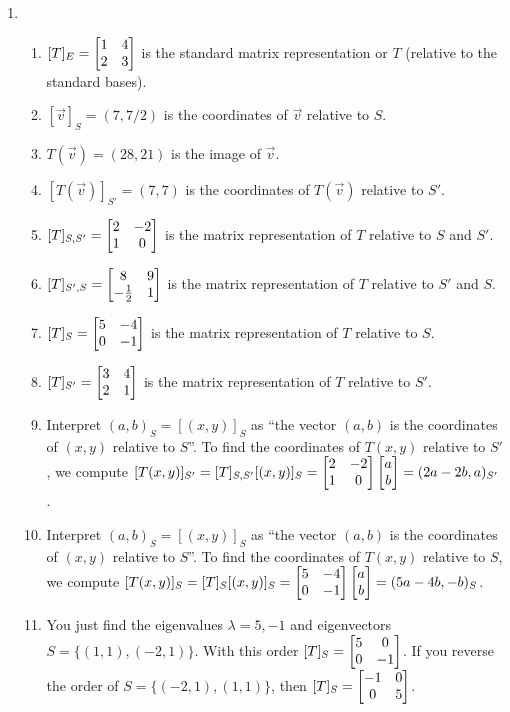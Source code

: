 {\begin{multicols}{2}
\begin{enumerate}
\item 
\begin{enumerate}
	\item $[T]_E = \begin{bmatrix}  1 & 4 \\2 & 3 \end{bmatrix}$ is the standard matrix representation or $T$ (relative to the standard bases).
	\item $[\vec v]_S = (7,7/2)$ is the coordinates of $\vec v$ relative to $S$. 
	\item $T(\vec v) = (28,21)$ is the image of $\vec v$.
	\item $[T(\vec v)]_{S'} = ( 7,7 ) $ is the coordinates  of $T(\vec v)$ relative to $S'$.
	\item $[T]_{S,S'}=\begin{bmatrix}  2 & -2 \\
 1 & 0
 \end{bmatrix}$ is the matrix representation of $T$ relative to $S$ and $S'$.
	\item $[T]_{S',S}=\begin{bmatrix}  8 & 9 \\
 -\frac{1}{2} & 1
 \end{bmatrix}$ is  the matrix representation of $T$  relative to $S'$ and $S$.
	\item $[T]_S=\begin{bmatrix}  5 & -4 \\
 0 & -1
 \end{bmatrix}$ is the matrix representation of $T$  relative to $S$.
	\item $[T]_{S'}=\begin{bmatrix}  3 & 4 \\
 2 & 1
 \end{bmatrix}$ is the matrix representation of $T$  relative to $S'$.
	\item Interpret $(a,b)_S = [(x,y)]_S$ as ``the vector $(a,b)$ is the coordinates of $(x,y)$ relative to $S$''.  To find the coordinates of $T(x,y)$ relative to $S'$, we compute $[T(x,y)]_{S'} = [T]_{S,S'}[(x,y)]_S = \begin{bmatrix}  2 & -2 \\
 1 & 0
 \end{bmatrix}\begin{bmatrix}  a \\
 b
 \end{bmatrix} = (2a-2b,a)_{S'}$.
	\item Interpret $(a,b)_S = [(x,y)]_S$ as ``the vector $(a,b)$ is the coordinates of $(x,y)$ relative to $S$''.  To find the coordinates of $T(x,y)$ relative to $S$, we compute $[T(x,y)]_{S} = [T]_{S}[(x,y)]_S = \begin{bmatrix}  5 & -4 \\
 0 & -1
 \end{bmatrix}\begin{bmatrix}  a \\
 b
 \end{bmatrix} = (5a-4b,-b)_{S}$.
	\item You just find the eigenvalues $\lambda = 5,-1$ and eigenvectors $S=\{(1,1),(-2,1)\}$.  With this order $[T]_S = \begin{bmatrix} 5&0\\0&-1 \end{bmatrix}$.  If you reverse the order of $S=\{(-2,1),(1,1)\}$, then $[T]_S = \begin{bmatrix} -1&0\\0&5 \end{bmatrix}$. 
\end{enumerate}


\end{enumerate}
\end{multicols}}
